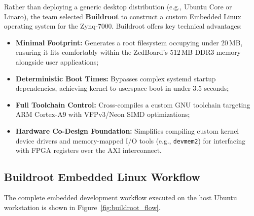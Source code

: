 \documentclass[12pt,a4paper]{article}
\begin{document}
Rather than deploying a generic desktop distribution (e.g., Ubuntu Core or Linaro), the team
selected \textbf{Buildroot} to construct a custom Embedded Linux operating system for the
Zynq-7000. Buildroot offers key technical advantages:
\begin{itemize}[noitemsep]
  \item \textbf{Minimal Footprint:} Generates a root filesystem occupying under 20\,MB,
  ensuring it fits comfortably within the ZedBoard's 512\,MB DDR3 memory alongside user applications;
  \item \textbf{Deterministic Boot Times:} Bypasses complex systemd startup dependencies,
  achieving kernel-to-userspace boot in under 3.5 seconds;
  \item \textbf{Full Toolchain Control:} Cross-compiles a custom GNU toolchain targeting ARM Cortex-A9
  with VFPv3/Neon SIMD optimizations;
  \item \textbf{Hardware Co-Design Foundation:} Simplifies compiling custom kernel device drivers
  and memory-mapped I/O tools (e.g., \texttt{devmem2}) for interfacing with FPGA registers over the
  AXI interconnect.
\end{itemize}

\subsection{Buildroot Embedded Linux Workflow}

The complete embedded development workflow executed on the host Ubuntu workstation is shown
in Figure~\ref{fig:buildroot_flow}.
\end{document}
